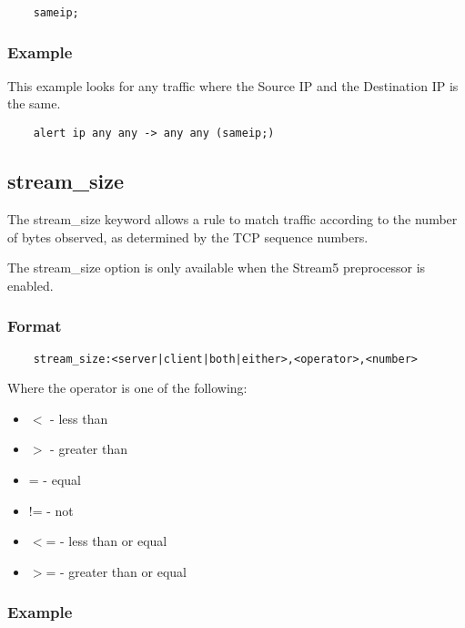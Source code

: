 \documentclass[english]{report}
\newenvironment{note}{
\samepage
    \vspace{10pt}{\textsf{
        {\hspace{7pt}\Huge{$\triangle$\hspace{-12.5pt}{\Large{$^!$}}}}\hspace{5pt}
        {\Large{NOTE}}
    }
    }
   \begin{center}
    \par\vspace{-17pt}

    \begin{lrbox}{\savepar}
    \begin{minipage}[r]{6in}
}
{
    \end{minipage}
    \end{lrbox}
    \fbox{
        \usebox{
            \savepar
	}
    }
    \par\vskip10pt
    \end{center}
}
\newenvironment{note}{
        \begin{rawhtml}
        <p><table border="1"><tr><td><b>
        Note:&nbsp;&nbsp;</b>
        \end{rawhtml}
}{
        \begin{rawhtml}
        </b></td></tr></table></p>
        \end{rawhtml}
}
\begin{document}
\begin{verbatim}
    sameip;
\end{verbatim}

\subsubsection{Example}

This example looks for any traffic where the Source IP and the Destination IP
is the same.

\begin{verbatim}
    alert ip any any -> any any (sameip;)
\end{verbatim}

\subsection{stream\_size}

The stream\_size keyword allows a rule to match traffic according to the number
of bytes observed, as determined by the TCP sequence numbers.  

\begin{note}

The stream\_size option is only available when the Stream5 preprocessor is
enabled.

\end{note}

\subsubsection{Format}

\begin{verbatim}
    stream_size:<server|client|both|either>,<operator>,<number>
\end{verbatim}

Where the operator is one of the following:

\begin{itemize}
\item $<$ - less than
\item $>$ - greater than
\item = - equal
\item != - not
\item $<$= - less than or equal
\item $>$= - greater than or equal
\end{itemize}

\subsubsection{Example}
\end{document}
